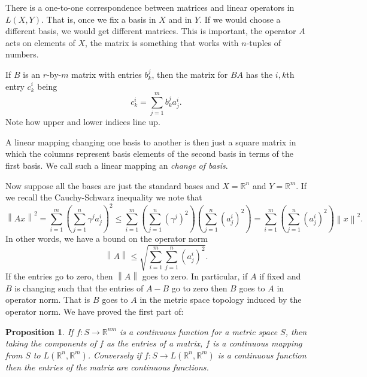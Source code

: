 \documentclass[12pt]{book}
\newcommand{\norm}[1]{\left\lVert {#1} \right\rVert}
\newcommand{\R}{{\mathbb{R}}}
\newcommand{\myindex}[1]{#1\index{#1}}
\theoremstyle{plain}
\newtheorem{prop}[thm]{Proposition}
\theoremstyle{remark}
\theoremstyle{definition}
\theoremstyle{exercise}
\theoremstyle{example}
\begin{document}
There is a one-to-one correspondence between matrices and linear operators in
$L(X,Y)$.  That is, once we fix a basis in $X$ and in $Y$.  If we would
choose a different basis, we would get different matrices.  This is
important, the operator $A$ acts on elements of $X$, the matrix
is something that works with $n$-tuples of numbers.

If $B$ is an $r$-by-$m$ matrix with entries $b_k^j$, then 
the matrix for $BA$ has the $i,k$th entry $c_k^i$ being
\begin{equation*}
c_k^i =
\sum_{j=1}^m b_k^ja_j^i .
\end{equation*}
Note how upper and lower indices line up.

A linear mapping changing one basis to another is then just a
square matrix in which the columns represent basis elements
of the second basis in terms of the first basis.  We call such a linear
mapping an \emph{\myindex{change of basis}}.



Now suppose all the bases are just the standard bases and
$X=\R^n$ and $Y=\R^m$. 
If we recall the Cauchy-Schwarz inequality we note
that
\begin{equation*}
\norm{Ax}^2
=
\sum_{i=1}^m { \left(\sum_{j=1}^n \gamma^j a_j^i \right)}^2
\leq
\sum_{i=1}^m { \left(\sum_{j=1}^n {(\gamma^j)}^2 \right) \left(\sum_{j=1}^n
{(a_j^i)}^2 \right) }
=
\sum_{i=1}^m \left(\sum_{j=1}^n {(a_j^i)}^2 \right)
\norm{x}^2 .
\end{equation*}
In other words, we have a bound on the operator norm
\begin{equation*}
\norm{A} \leq
\sqrt{\sum_{i=1}^m \sum_{j=1}^n {(a_j^i)}^2} .
\end{equation*}
If the entries go to zero, then $\norm{A}$ goes to zero.  In
particular, if $A$ if fixed and $B$ is changing such
that the entries of $A-B$ go to zero then $B$ goes to $A$
in operator norm.  That is $B$ goes to $A$
in the metric space topology induced by the
operator norm.  We have proved the first part of:

\begin{prop}
If $f \colon S \to \R^{nm}$ is a continuous function
for a metric space $S$,
then taking the components of $f$ as the entries of a matrix,
$f$ is a continuous mapping from $S$
to $L(\R^n,\R^m)$.
Conversely if $f \colon S \to L(\R^n,\R^m)$ is a continuous
function then the entries of the matrix are continuous functions.
\end{prop}
\end{document}
